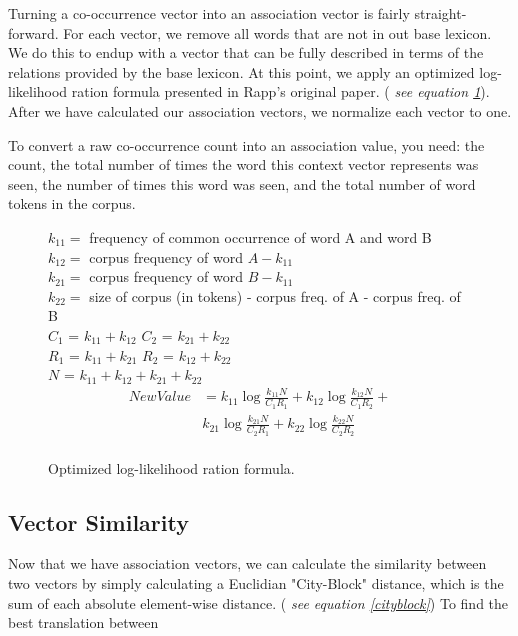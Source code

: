 \documentclass[12pt]{article}
\begin{document}
Turning a co-occurrence vector into an association vector is fairly straight-forward. For each vector, we remove all words that are not in out base lexicon. We do this to endup with a vector that can be fully described in terms of the relations provided by the base lexicon. At this point, we apply an optimized log-likelihood ration formula presented in Rapp's original paper. (\emph{ see equation \ref{loglike}}). After we have calculated our association vectors, we normalize each vector to one.

To convert a raw co-occurrence count into an association value, you need: the count, the total number of times the word this context vector represents was seen, the number of times this word was seen, and the total number of word tokens in the corpus.

\begin{figure}
$k_{11} =$ frequency of common occurrence of word A and word B \\
$k_{12} =$ corpus frequency of word $A - k_{11}$ \\
$k_{21} =$ corpus frequency of word $B - k_{11}$ \\
$k_{22} =$ size of corpus (in tokens) - corpus freq. of A - corpus freq. of B \\

$C_1$ = $k_{11} + k_{12}$ 
$C_2$ = $k_{21} + k_{22}$ \\
$R_1$ = $k_{11} + k_{21}$ 
$R_2$ = $k_{12} + k_{22}$ \\
$N$ = $k_{11} + k_{12} + k_{21} + k_{22}$ \\

  \begin{eqnarray*}
New Value &= k_{11}\log\frac{k_{11}N}{C_1R_1} +  k_{12}\log\frac{k_{12}N}{C_1R_2} + \\
  & k_{21}\log\frac{k_{21}N}{C_2R_1} +  k_{22}\log\frac{k_{22}N}{C_2R_2} \\
  \end{eqnarray*}

  \caption{Optimized log-likelihood ration formula.}
  \label{loglike}
\end{figure}


\subsection{Vector Similarity}

Now that we have association vectors, we can calculate the similarity between two vectors by simply calculating a Euclidian "City-Block" distance, which is the sum of each absolute element-wise distance. (\emph{ see equation \ref{cityblock}}) To find the best translation between 
\end{document}
